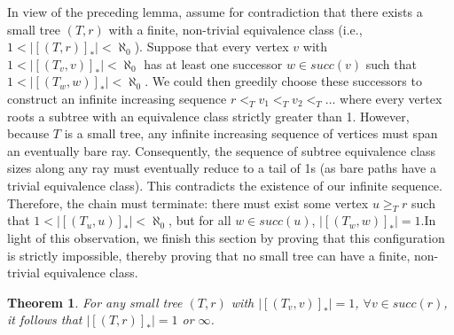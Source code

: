 \documentclass[12pt]{amsart}
\newtheorem{theorem}{Theorem}[section]
\numberwithin{mytheorem}{section} %
\numberwithin{mylemma}{section} %
\numberwithin{mycorollary}{section} %
\begin{document}
In view of the preceding lemma, assume for contradiction that there exists a small tree $(T,r)$ with a finite, non-trivial equivalence class (i.e., $1 < |[(T,r)]_*| < \aleph_0$). Suppose that every vertex $v$ with $1 < |[(T_v, v)]_*| < \aleph_0$ has at least one successor $w \in succ(v)$ such that $1 < |[(T_w, w)]_*| < \aleph_0$. We could then greedily choose these successors to construct an infinite increasing sequence $r <_T v_1 <_T v_2 <_T \ldots$ where every vertex roots a subtree with an equivalence class strictly greater than 1. However, because $T$ is a small tree, any infinite increasing sequence of vertices must span an eventually bare ray. Consequently, the sequence of subtree equivalence class sizes along any ray must eventually reduce to a tail of 1s (as bare paths have a trivial equivalence class). This contradicts the existence of our infinite sequence. Therefore, the chain must terminate: there must exist some vertex $u \geq_T r$ such that $1 < |[(T_u, u)]_*| < \aleph_0$, but for all $w \in succ(u)$, $|[(T_w, w)]_*| = 1$.In light of this observation, we finish this section by proving that this configuration is strictly impossible, thereby proving that no small tree can have a finite, non-trivial equivalence class.

\begin{theorem} For any small tree $(T,r)$ with $|[(T_v, v)]_*| =1$, $\forall v \in succ(r)$, it follows that $|[(T,r)]_*| =1$ or $\infty$. 
\end{theorem}
\end{document}
